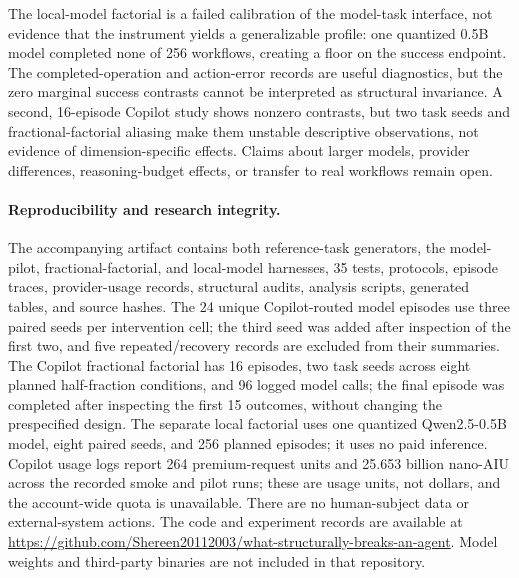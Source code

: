 \documentclass[sigconf,nonacm]{acmart}
\begin{document}
The local-model factorial is a failed calibration of the model-task
interface, not evidence that the instrument yields a generalizable profile:
one quantized 0.5B model completed none of 256 workflows, creating a floor
on the success endpoint. The completed-operation and action-error records
are useful diagnostics, but the zero marginal success contrasts cannot be
interpreted as structural invariance. A second, 16-episode Copilot study
shows nonzero contrasts, but two task seeds and fractional-factorial
aliasing make them unstable descriptive observations, not evidence of
dimension-specific effects. Claims about larger models, provider
differences, reasoning-budget effects, or transfer to real workflows remain
open.

\paragraph{Reproducibility and research integrity.}
The accompanying artifact contains both reference-task generators, the
model-pilot, fractional-factorial, and local-model harnesses, 35 tests,
protocols, episode traces,
provider-usage records, structural audits, analysis scripts, generated
tables, and source hashes. The 24 unique Copilot-routed model episodes use
three paired seeds per intervention cell; the third seed was added after
inspection of the first two, and five repeated/recovery records are excluded
from their summaries. The Copilot fractional factorial has 16 episodes,
two task seeds across eight planned half-fraction conditions, and 96 logged
model calls; the final episode was completed after inspecting
the first 15 outcomes, without changing the prespecified design. The
separate local factorial uses one quantized
Qwen2.5-0.5B model, eight paired seeds, and 256 planned episodes; it uses no
paid inference. Copilot usage logs report 264 premium-request units and
25.653 billion nano-AIU across the recorded smoke and pilot runs; these are
usage units, not dollars, and the account-wide quota is unavailable. There
are no human-subject data or external-system actions. The code and experiment records are available at
\url{https://github.com/Shereen20112003/what-structurally-breaks-an-agent}.
Model weights and third-party binaries are not included in that repository.
\end{document}
